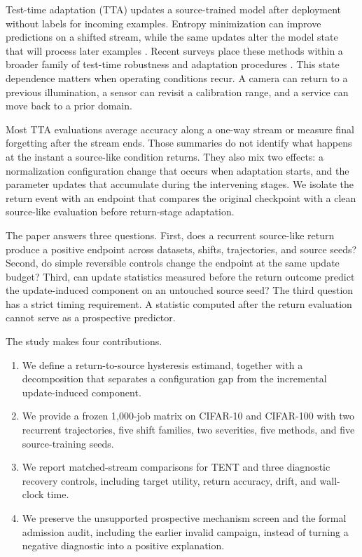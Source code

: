\documentclass[11pt]{article}
\begin{document}
Test-time adaptation (TTA) updates a source-trained model after deployment without labels for incoming examples. Entropy minimization can improve predictions on a shifted stream, while the same updates alter the model state that will process later examples \citep{tent,continual,eata}. Recent surveys place these methods within a broader family of test-time robustness and adaptation procedures \citep{survey}. This state dependence matters when operating conditions recur. A camera can return to a previous illumination, a sensor can revisit a calibration range, and a service can move back to a prior domain.

Most TTA evaluations average accuracy along a one-way stream or measure final forgetting after the stream ends. Those summaries do not identify what happens at the instant a source-like condition returns. They also mix two effects: a normalization configuration change that occurs when adaptation starts, and the parameter updates that accumulate during the intervening stages. We isolate the return event with an endpoint that compares the original checkpoint with a clean source-like evaluation before return-stage adaptation.

The paper answers three questions. First, does a recurrent source-like return produce a positive endpoint across datasets, shifts, trajectories, and source seeds? Second, do simple reversible controls change the endpoint at the same update budget? Third, can update statistics measured before the return outcome predict the update-induced component on an untouched source seed? The third question has a strict timing requirement. A statistic computed after the return evaluation cannot serve as a prospective predictor.

The study makes four contributions.
\begin{enumerate}[leftmargin=1.4em]
    \item We define a return-to-source hysteresis estimand, together with a decomposition that separates a configuration gap from the incremental update-induced component.
    \item We provide a frozen 1,000-job matrix on CIFAR-10 and CIFAR-100 with two recurrent trajectories, five shift families, two severities, five methods, and five source-training seeds.
    \item We report matched-stream comparisons for TENT and three diagnostic recovery controls, including target utility, return accuracy, drift, and wall-clock time.
    \item We preserve the unsupported prospective mechanism screen and the formal admission audit, including the earlier invalid campaign, instead of turning a negative diagnostic into a positive explanation.
\end{enumerate}
\end{document}
